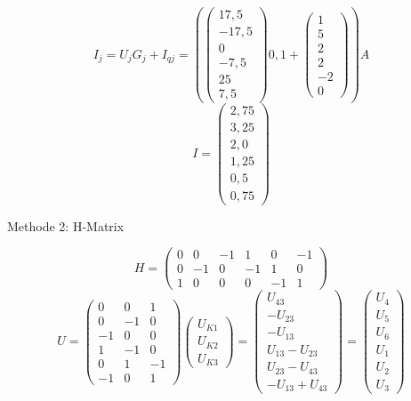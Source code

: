 \documentclass[german]{article}
\begin{document}
\[
	I_j = U_j G_j + I_{qj} = \left( \begin{pmatrix}
		17,5 \\
		-17,5 \\
		0 \\
		-7,5 \\
		25 \\
		7,5
	\end{pmatrix} 0,1 + \begin{pmatrix}
		1 \\
		5 \\
		2 \\
		2 \\
		-2 \\
		0
	\end{pmatrix} \right) A
\]
\[
	I = \begin{pmatrix}
		2,75 \\
		3,25 \\
		2,0 \\
		1,25 \\
		0,5 \\
		0,75
	\end{pmatrix}
\]

Methode 2: H-Matrix

\[
	H = \begin{pmatrix}
		0 & 0 & -1 & 1 & 0 & -1 \\
		0 & -1 & 0 & -1 & 1 & 0 \\
		1 & 0 & 0 & 0 & -1 & 1
	\end{pmatrix}
\]
\[
	U = \begin{pmatrix}
		0 & 0 & 1 \\
		0 & -1 & 0 \\
		-1 & 0 & 0 \\
		1 & -1 & 0 \\
		0 & 1 & -1 \\
		-1 & 0 & 1
	\end{pmatrix}
	\begin{pmatrix}
		U_{K1} \\
		U_{K2} \\
		U_{K3}
	\end{pmatrix}
	=
	\begin{pmatrix}
		U_{43} \\
		- U_{23} \\
		- U_{13} \\
		U_{13} - U_{23} \\
		U_{23} - U_{43} \\
		- U_{13} + U_{43}
	\end{pmatrix}
	=
	\begin{pmatrix}
		U_4 \\
		U_5 \\
		U_6 \\
		U_1 \\
		U_2 \\
		U_3
	\end{pmatrix}
\]
\end{document}
